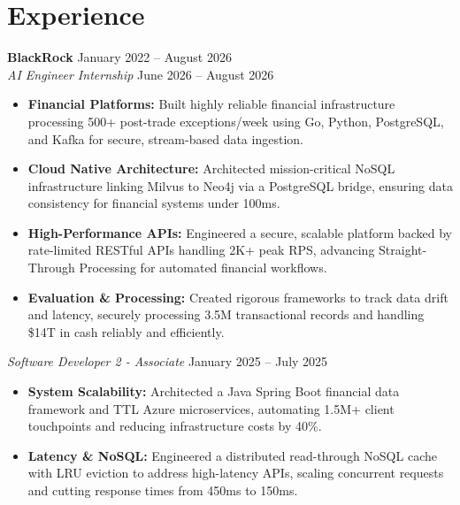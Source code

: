 \documentclass[11pt,a4paper]{article}
\begin{document}
\section{Experience}
\noindent
\textbf{BlackRock} \hfill January 2022 -- August 2026 \\
\textit{AI Engineer Internship} \hfill June 2026 -- August 2026
\begin{itemize}[leftmargin=*,noitemsep,topsep=0pt]
    \item \textbf{Financial Platforms:} Built highly reliable financial infrastructure processing 500+ post-trade exceptions/week using Go, Python, PostgreSQL, and Kafka for secure, stream-based data ingestion.
    \item \textbf{Cloud Native Architecture:} Architected mission-critical NoSQL infrastructure linking Milvus to Neo4j via a PostgreSQL bridge, ensuring data consistency for financial systems under 100ms.
    \item \textbf{High-Performance APIs:} Engineered a secure, scalable platform backed by rate-limited RESTful APIs handling 2K+ peak RPS, advancing Straight-Through Processing for automated financial workflows.
    \item \textbf{Evaluation \& Processing:} Created rigorous frameworks to track data drift and latency, securely processing 3.5M transactional records and handling \$14T in cash reliably and efficiently.
\end{itemize}

\vspace{3pt}
\noindent
\textit{Software Developer 2 - Associate} \hfill January 2025 -- July 2025
\begin{itemize}[leftmargin=*,noitemsep,topsep=0pt]
    \item \textbf{System Scalability:} Architected a Java Spring Boot financial data framework and TTL Azure microservices, automating 1.5M+ client touchpoints and reducing infrastructure costs by 40\%.
    \item \textbf{Latency \& NoSQL:} Engineered a distributed read-through NoSQL cache with LRU eviction to address high-latency APIs, scaling concurrent requests and cutting response times from 450ms to 150ms.
\end{itemize}
\end{document}
